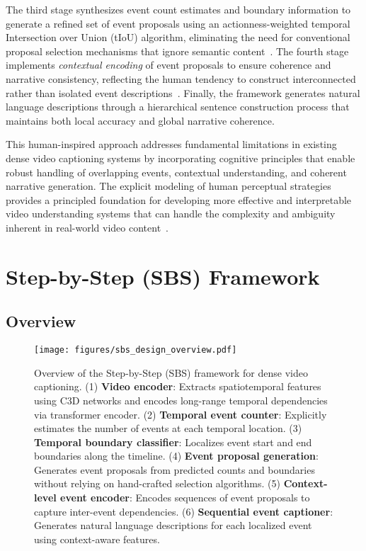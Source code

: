 The third stage synthesizes event count estimates and boundary information to generate a refined set of event proposals using an actionness-weighted temporal Intersection over Union (tIoU) algorithm, eliminating the need for conventional proposal selection mechanisms that ignore semantic content~\cite{lin2019bmn,hosang2017learning}. The fourth stage implements \textit{contextual encoding} of event proposals to ensure coherence and narrative consistency, reflecting the human tendency to construct interconnected rather than isolated event descriptions~\cite{zhu2020understanding,wang2018temporal}. Finally, the framework generates natural language descriptions through a hierarchical sentence construction process that maintains both local accuracy and global narrative coherence.

This human-inspired approach addresses fundamental limitations in existing dense video captioning systems by incorporating cognitive principles that enable robust handling of overlapping events, contextual understanding, and coherent narrative generation. The explicit modeling of human perceptual strategies provides a principled foundation for developing more effective and interpretable video understanding systems that can handle the complexity and ambiguity inherent in real-world video content~\cite{bhooshan2022multimodal,li2022adaptive}.



\section{Step-by-Step (SBS) Framework}

\subsection{Overview} 
\label{subsec:method_overview}

\begin{sidewaysfigure}
  \centering
  \texttt{[image: figures/sbs\_design\_overview.pdf]}
  \caption{
    Overview of the Step-by-Step (SBS) framework for dense video captioning.
    (1) \textbf{Video encoder}: Extracts spatiotemporal features using C3D networks and encodes long-range temporal dependencies via transformer encoder.
    (2) \textbf{Temporal event counter}: Explicitly estimates the number of events at each temporal location.
    (3) \textbf{Temporal boundary classifier}: Localizes event start and end boundaries along the timeline.
    (4) \textbf{Event proposal generation}: Generates event proposals from predicted counts and boundaries without relying on hand-crafted selection algorithms.
    (5) \textbf{Context-level event encoder}: Encodes sequences of event proposals to capture inter-event dependencies.
    (6) \textbf{Sequential event captioner}: Generates natural language descriptions for each localized event using context-aware features.
  }
  \label{fig:method_overview}
\end{sidewaysfigure}

